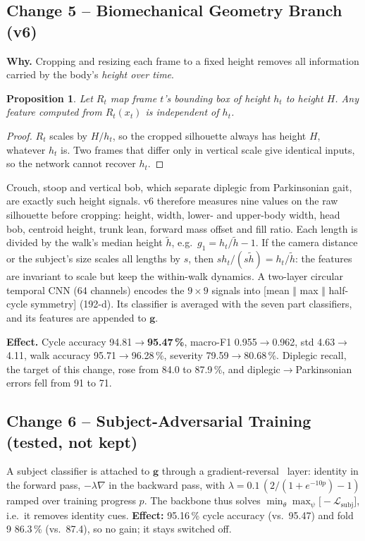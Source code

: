 \documentclass[conference]{IEEEtran}
\newtheorem{proposition}{Proposition}
\begin{document}
\subsection{Change 5 -- Biomechanical Geometry Branch (v6)}
\textbf{Why.} Cropping and resizing each frame to a fixed height removes all
information carried by the body's \emph{height over time}.
\begin{proposition}
Let $R_t$ map frame $t$'s bounding box of height $h_t$ to height $H$. Any
feature computed from $R_t(x_t)$ is independent of $h_t$.
\end{proposition}
\begin{proof}
$R_t$ scales by $H/h_t$, so the cropped silhouette always has height $H$,
whatever $h_t$ is. Two frames that differ only in vertical scale give identical
inputs, so the network cannot recover $h_t$.
\end{proof}
Crouch, stoop and vertical bob, which separate diplegic from Parkinsonian gait,
are exactly such height signals. v6 therefore measures nine values on the raw
silhouette before cropping: height, width, lower- and upper-body width, head
bob, centroid height, trunk lean, forward mass offset and fill ratio. Each
length is divided by the walk's median height $\tilde h$, e.g.\
$g_1=h_t/\tilde h-1$. If the camera distance or the subject's size scales all
lengths by $s$, then $s h_t/(s\tilde h)=h_t/\tilde h$: the features are
invariant to scale but keep the within-walk dynamics. A two-layer circular
temporal CNN (64 channels) encodes the $9\times9$ signals into
[mean $\Vert$ max $\Vert$ half-cycle symmetry] (192-d). Its classifier is
averaged with the seven part classifiers, and its features are appended to
$\mathbf g$.

\textbf{Effect.} Cycle accuracy 94.81$\rightarrow$\textbf{95.47\,\%}, macro-F1
0.955$\rightarrow$0.962, std 4.63$\rightarrow$4.11, walk accuracy
95.71$\rightarrow$96.28\,\%, severity 79.59$\rightarrow$80.68\,\%. Diplegic
recall, the target of this change, rose from 84.0 to 87.9\,\%, and
diplegic$\rightarrow$Parkinsonian errors fell from 91 to 71.

\subsection{Change 6 -- Subject-Adversarial Training (tested, not kept)}
A subject classifier is attached to $\mathbf g$ through a gradient-reversal~\cite{ganin2015}
layer: identity in the forward pass, $-\lambda\nabla$ in the backward pass,
with $\lambda=0.1\,(2/(1+e^{-10p})-1)$ ramped over training progress $p$. The
backbone thus solves $\min_\theta\max_\psi\big[-\mathcal{L}_{\text{subj}}\big]$,
i.e.\ it removes identity cues. \textbf{Effect:} 95.16\,\% cycle accuracy (vs.\
95.47) and fold 9 86.3\,\% (vs.\ 87.4), so no gain; it stays switched off.
\end{document}
